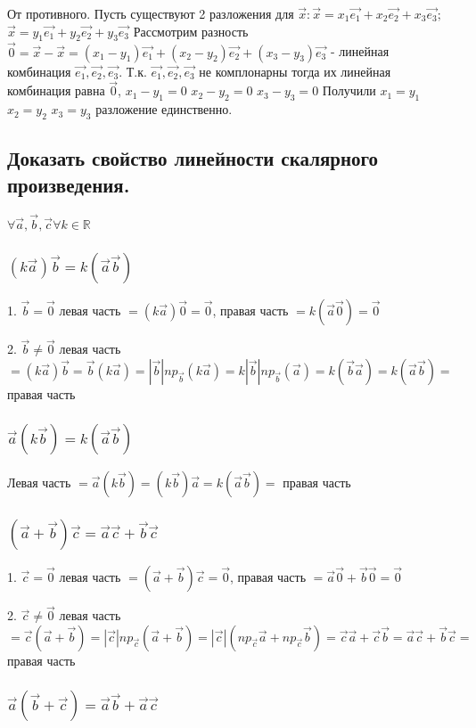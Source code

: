 \documentclass[a4paper, 10pt]{article}
\renewcommand{\a}{\vec{a}}
\renewcommand{\b}{\vec{b}}
\renewcommand{\c}{\vec{c}}
\newcommand{\nul}{\vec{0}}
\begin{document}
От противного. Пусть существуют 2 разложения для 
$\vec{x}: \vec{x} = x_1\vec{e_1} + x_2\vec{e_2} + x_3\vec{e_3};$
$\vec{x} = y_1\vec{e_1} + y_2\vec{e_2} + y_3\vec{e_3}$
Рассмотрим разность $\nul = \vec{x} - \vec{x} = 
(x_1 - y_1)\vec{e_1} + (x_2 - y_2)\vec{e_2} + (x_3 - y_3)\vec{e_3}$ - линейная комбинация 
$\vec{e_1}, \vec{e_2}, \vec{e_3}$. Т.к. $\vec{e_1}, \vec{e_2}, \vec{e_3}$ не комплонарны
тогда их линейная комбинация равна $\nul$, $x_1 - y_1 = 0$ $x_2 - y_2 = 0$ $x_3 - y_3 = 0$
Получили $x_1 = y_1$ $x_2 = y_2$ $x_3 = y_3$ разложение единственно.

\subsection{Доказать свойство линейности скалярного произведения.}

\begin{center}
    $\forall \a, \b, \c \forall k \in \mathbb{R}$
\end{center}

\subsubsection{$(k\a)\b = k(\a\b)$}

1. $\b = \nul$ левая часть $ = (k\a)\nul = \nul$, правая часть $ = k(\a\nul) = \nul$

2. $\b \ne \nul$ левая часть $ = (k\a)\b = \b(k\a) = |\b|np_{\b}(k\a) =
k|\b|np_{\b}(\a) = k(\b\a) = k(\a\b) = $ правая часть

\subsubsection{$\a(k\b) = k(\a\b)$}

Левая часть $ = \a(k\b) = (k\b)\a = k(\a\b) = $ правая часть

\subsubsection{$(\a + \b)\c = \a\c + \b\c$}

1. $\c = \nul$ левая часть $ = (\a + \b)\c = \nul$, 
правая часть $ = \a\nul + \b\nul = \nul$

2. $\c \ne \nul$ левая часть $ = \c(\a + \b) = |\c|np_{\c}(\a + \b) =
|\c|(np_{\c}\a + np_{\c}\b) = \c\a + \c\b = 
\a\c + \b\c = $ правая часть

\subsubsection{$\a(\b + \c) = \a\b + \a\c$}
\end{document}
